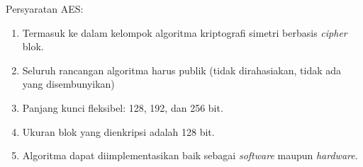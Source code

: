 \documentclass{article}
\begin{document}

Persyaratan AES:\
\begin{enumerate}
  \item Termasuk ke dalam kelompok algoritma kriptografi simetri berbasis \textit{cipher} blok.
  \item Seluruh rancangan algoritma harus publik (tidak dirahasiakan, tidak ada yang disembunyikan)
  \item Panjang kunci fleksibel: 128, 192, dan 256 bit.
  \item Ukuran blok yang dienkripsi adalah 128 bit.
  \item Algoritma dapat diimplementasikan baik sebagai \textit{software} maupun \textit{hardware}.
\end{enumerate}
\end{document}
